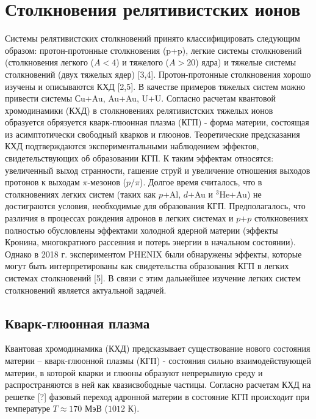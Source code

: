 
\chapter{Столкновения релятивистских ионов} \label{ch:ch1}
Системы релятивистских столкновений принято классифицировать следующим образом: протон-протонные столкновения (p+p), легкие системы столкновений (столкновения легкого ($A < 4$) и тяжелого ($A > 20$) ядра) и тяжелые системы столкновений (двух тяжелых ядер) [3,4]. Протон-протонные столкновения хорошо изучены и описываются КХД [2,5]. В качестве примеров тяжелых систем можно привести системы Сu+Au, Au+Au, U+U. Согласно расчетам квантовой хромодинамики (КХД) в столкновениях релятивистских тяжелых ионов образуется обрязуется кварк-глюонная плазма (КГП) - форма материи, состоящая из асимптотически свободный кварков и глюонов. Теоретические предсказания КХД подтверждаются экспериментальными наблюдением эффектов, свидетельствующих об образовании КГП. К таким эффектам относятся: увеличенный выход странности, гашение струй и увеличение отношения выходов протонов к выходам $\pi$-мезонов ($p/\pi$). Долгое время считалось, что в столкновениях легких систем (таких как $p$+Al, $d$+Au и $^3$He+Au) не достиграются условия, необходимые для образования КГП. Предполагалось, что различия в процессах рождения адронов в легких системах и $p$+$p$ столкновениях полностью обусловлены эффектами холодной ядерной материи (эффекты Кронина, многократного рассеяния и потерь энергии в начальном состоянии). Однако в 2018 г. экспериментом PHENIX были обнаружены эффекты, которые могут быть интерпретированы как свидетельства образования КГП в легких системах столкновений [5]. В связи с этим дальнейшее изучение легких систем столкновений является актуальной задачей. 

\section{Кварк-глюонная плазма} \label{sec:ch1/sec1}
Квантовая хромодинамика (КХД) предсказывает существование нового состояния материи – кварк-глюонной плазмы (КГП) - состояния сильно взаимодействующей материи, в которой кварки и глюоны образуют непрерывную среду и распространяются в ней как квазисвободные частицы.
Согласно расчетам КХД на решетке [?]  фазовый переход  адронной материи в состояние КГП происходит при температуре $ T \approx 170$ МэВ ($1012$ К).



